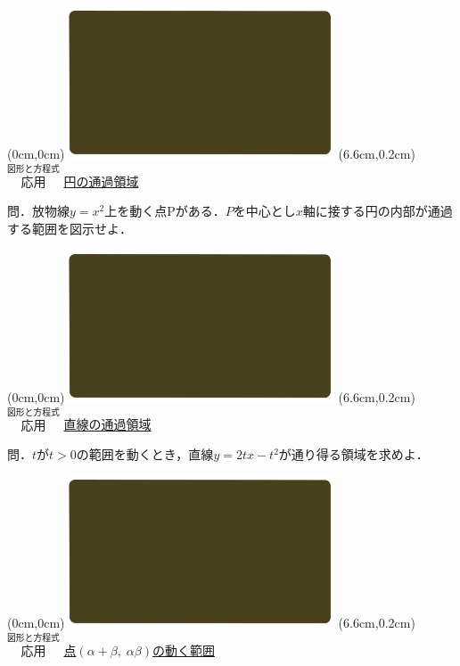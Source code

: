 \documentclass[10pt,
fleqn,
dvipdfmx,
uplatex
]{jsarticle}
\begin{document}
\bf\boldmath



\at(0cm,0cm){\includegraphics[width=8cm,bb=0 0 1920 1080]{./youtube/thumbnails/templates/smart_background/図形と方程式.jpeg}}
\at(6.6cm,0.2cm){\small\color{bradorange}$\overset{\text{図形と方程式}}{\text{応用}}$}
{\color{orange}\huge\underline{円の通過領域}}\vspace{0.3zw}

\Large 
問．放物線$y=x^2$上を動く点$\text{P}$がある．$P$を中心とし$x$軸に接する円の内部が通過する範囲を図示せよ．


\newpage



\at(0cm,0cm){\includegraphics[width=8cm,bb=0 0 1920 1080]{./youtube/thumbnails/templates/smart_background/図形と方程式.jpeg}}
\at(6.6cm,0.2cm){\small\color{bradorange}$\overset{\text{図形と方程式}}{\text{応用}}$}
{\color{orange}\huge\underline{直線の通過領域}}\vspace{0.3zw}

\LARGE 
問．$t$が$t>0$の範囲を動くとき，直線$y=2tx-t^2$が通り得る領域を求めよ．


\newpage



\at(0cm,0cm){\includegraphics[width=8cm,bb=0 0 1920 1080]{./youtube/thumbnails/templates/smart_background/図形と方程式.jpeg}}
\at(6.6cm,0.2cm){\small\color{bradorange}$\overset{\text{図形と方程式}}{\text{応用}}$}
{\color{orange}\Large\underline{点$\left(\alpha +\beta ,\;\alpha \beta \right)$の動く範囲}}\vspace{0.3zw}
\end{document}
